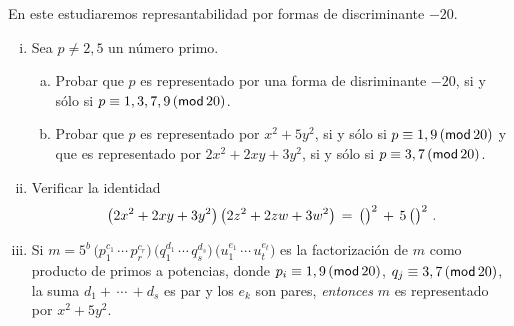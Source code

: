 \begin{ejerDefinidas}\label{ejer:definidas:menos-veinte}
	En este \ejername estudiaremos represantabilidad por formas
	de discriminante $-20$.
	\begin{enumerate}[(i)]
		\item\label{item:ejer:definidas:menos-veinte:i}
			Sea $p\neq 2,5$ un n\'umero primo.
			\begin{enumerate}[(a)]
				\item Probar que $p$ es representado
					por una forma de disriminante
					$-20$, si y s\'olo si
					$p\equiv 1,3,7,9\tmodulo[20]$.
				\item Probar que $p$ es representado
					por $x^2+5y^2$, si y s\'olo si
					$p\equiv 1,9\tmodulo[20]$ y que
					es representado por
					$2x^2+2xy+3y^2$, si y s\'olo si
					$p\equiv 3,7\tmodulo[20]$.
			\end{enumerate}
		\item\label{item:ejer:definidas:menos-veinte:ii}
			Verificar la identidad
			\begin{displaymath}
				\big(2x^2+2xy+3y^2\big)\,
				\big(2z^2+2zw+3w^2\big)\,=\,
				\big(\big)^2\,+\,
				5\,\big(\big)^2
				\dispstop
			\end{displaymath}
		\item\label{item:ejer:definidas:menos-veinte:iii}
			Si
			\begin{math}
				m=5^b\,
				\big(p_1^{c_1}\,\cdots\,p_r^{c_r}\big)\,
				\big(q_1^{d_1}\,\cdots\,q_s^{d_s}\big)\,
				\big(u_1^{e_1}\,\cdots\,u_t^{e_t}\big)
			\end{math}
			es la factorizaci\'on de $m$ como producto de
			primos a potencias, donde
			$p_i\equiv 1,9\tmodulo[20]$,
			$q_j\equiv 3,7\tmodulo[20]$,
			la suma $d_1+\,\cdots\,+d_s$ es par y
			los $e_k$ son pares, \emph{entonces}
			$m$ es representado por $x^2+5y^2$.
	\end{enumerate}
\end{ejerDefinidas}

